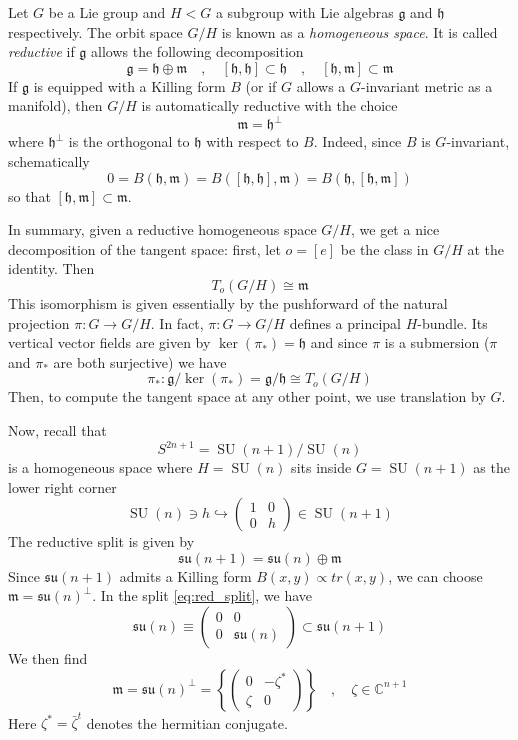 \documentclass[a4paper,11pt]{article}
\theoremstyle{definition}
\newcommand{\CC}{\mathbb{C}}
\DeclareMathOperator{\SU}{SU}
\newcommand{\g}{\mathfrak{g}}
\newcommand{\h}{\mathfrak{h}}
\newcommand{\m}{\mathfrak{m}}
\newcommand{\su}{\mathfrak{su}}
\newcommand{\mat}[4]{\begin{pmatrix} #1 & #2 \\ #3 & #4 \end{pmatrix}}
\begin{document}
Let $G$ be a Lie group and $H < G$ a subgroup with Lie algebras $\g$ and $\h$ respectively.
The orbit space $G/H$ is known as a \emph{homogeneous space}. 
It is called \emph{reductive} if $\g$ allows the following decomposition
\begin{equation}
  \g = \h \oplus \m \quad , \quad [\h,\h] \subset \h \quad , \quad [\h,\m] \subset \m
\end{equation}
If $\g$ is equipped with a Killing form $B$ (or if $G$ allows a $G$-invariant metric as a manifold), then $G/H$ is automatically reductive with the choice 
\begin{equation}
  \m = \h^{\perp}
\end{equation}
where $\h^{\perp}$ is the orthogonal to $\h$ with respect to $B$.
Indeed, since $B$ is $G$-invariant, schematically
\begin{equation}
  0 = B(\h,\m) = B([\h,\h],\m) = B(\h,[\h,\m])
\end{equation}
so that $[\h,\m] \subset \m$.

In summary, given a reductive homogeneous space $G/H$, we get a nice decomposition of the tangent space: first, let $o = [e]$ be the class in $G/H$ at the identity.
Then 
\begin{equation}
  T_o(G/H) \cong \m
\end{equation}
This isomorphism is given essentially by the pushforward of the natural projection $\pi \colon G \to G/H$.
In fact, $\pi \colon G \to G/H$ defines a principal $H$-bundle. 
Its vertical vector fields are given by $\ker(\pi_*) = \h$ and since $\pi$ is a submersion ($\pi$ and $\pi_*$ are both surjective) we have
\begin{equation}
  \pi_* \colon \g / \ker(\pi_*) = \g / \h \cong T_o(G/H)
\end{equation}
Then, to compute the tangent space at any other point, we use translation by $G$.

Now, recall that 
\begin{equation}
  S^{2n + 1} = \SU(n+1) / \SU(n)
\end{equation}
is a homogeneous space where $H = \SU(n)$ sits inside $G = \SU(n+1)$ as the lower right corner
\begin{equation}
  \SU(n) \ni h \hookrightarrow \mat{1}{0}{0}{h} \in \SU(n+1)
\end{equation}
The reductive split is given by 
\begin{equation}
  \su(n+1) = \su(n) \oplus \m
  \label{eq:red_split}
\end{equation}
Since $\su(n+1)$ admits a Killing form $B(x,y) \propto tr(x,y)$, we can choose $\m = \su(n)^{\perp}$.
In the split \eqref{eq:red_split}, we have 
\begin{equation}
  \su(n) \equiv \mat{0}{0}{0}{\su(n)} \subset \su(n+1)
\end{equation}
We then find 
\begin{equation}
  \m = \su(n)^{\perp} = \left\{ \mat{0}{-\zeta^*}{\zeta}{0} \right\} \quad , \quad \zeta \in \CC^{n+1}
\end{equation}
Here $\zeta^* = \bar \zeta^t$ denotes the hermitian conjugate. 
\end{document}

